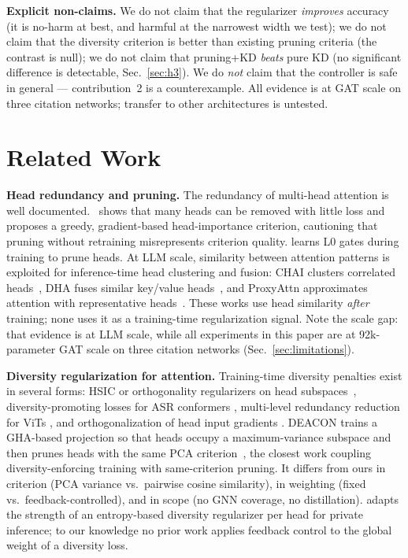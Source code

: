 \documentclass{ws-ijprai}
\begin{document}
\noindent\textbf{Explicit non-claims.} We do not claim that the regularizer
\emph{improves} accuracy (it is no-harm at best, and harmful at the narrowest
width we test); we do not claim that the diversity criterion is better than
existing pruning criteria (the contrast is null); we do not claim that
pruning+KD \emph{beats} pure KD (no significant difference is detectable,
Sec.~\ref{sec:h3}). We do \emph{not} claim that the controller is safe in
general --- contribution~2 is a counterexample. All evidence is at GAT scale on
three citation networks; transfer to other architectures is untested.

\section{Related Work}
\label{sec:related}

\textbf{Head redundancy and pruning.} The redundancy of multi-head attention is
well documented.~\cite{michel2019} shows that many heads can be removed with
little loss and proposes a greedy, gradient-based head-importance criterion,
cautioning that pruning without retraining misrepresents criterion quality.
\cite{voita2019} learns L0 gates during training to prune heads. At LLM scale,
similarity between attention patterns is exploited for inference-time head
clustering and fusion: CHAI clusters correlated heads~\cite{chai2024}, DHA
fuses similar key/value heads~\cite{dha2024}, and ProxyAttn approximates
attention with representative heads~\cite{proxyattn2025}. These works use head
similarity \emph{after} training; none uses it as a training-time
regularization signal. Note the scale gap: that evidence is at LLM scale,
while all experiments in this paper are at 92k-parameter GAT scale on three
citation networks (Sec.~\ref{sec:limitations}).

\textbf{Diversity regularization for attention.} Training-time diversity
penalties exist in several forms: HSIC or orthogonality regularizers on head
subspaces~\cite{yun2021}, diversity-promoting losses for ASR conformers
\cite{audhkhasi2022}, multi-level redundancy reduction for ViTs
\cite{chen2022}, and orthogonalization of head input gradients
\cite{nicolicioiu2023}. DEACON trains a GHA-based projection so that heads
occupy a maximum-variance subspace and then prunes heads with the same PCA
criterion~\cite{deacon2024}, the closest work coupling diversity-enforcing
training with same-criterion pruning. It differs from ours in criterion (PCA
variance vs.\ pairwise cosine similarity), in weighting (fixed vs.\
feedback-controlled), and in scope (no GNN coverage, no distillation).
\cite{jhareagen2025} adapts the strength of an entropy-based diversity
regularizer per head for private inference; to our knowledge no prior work
applies feedback control to the global weight of a diversity loss.
\end{document}
